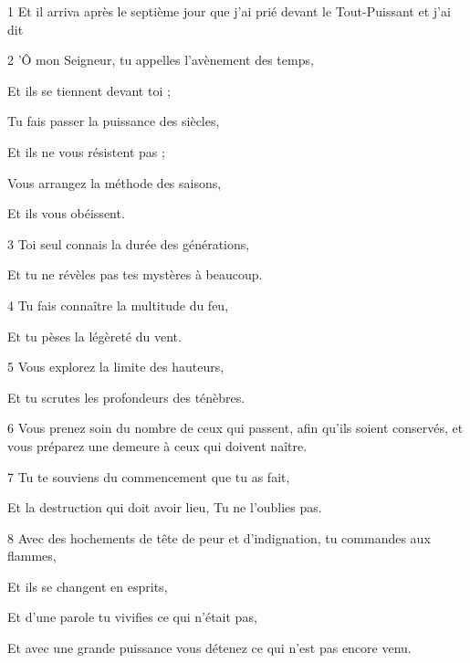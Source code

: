 \par 1 Et il arriva après le septième jour que j'ai prié devant le Tout-Puissant et j'ai dit

\par 2 'Ô mon Seigneur, tu appelles l'avènement des temps,

\par Et ils se tiennent devant toi ;

\par Tu fais passer la puissance des siècles,

\par Et ils ne vous résistent pas ;

\par Vous arrangez la méthode des saisons,

\par Et ils vous obéissent.

\par 3 Toi seul connais la durée des générations,

\par Et tu ne révèles pas tes mystères à beaucoup.

\par 4 Tu fais connaître la multitude du feu,

\par Et tu pèses la légèreté du vent.

\par 5 Vous explorez la limite des hauteurs,

\par Et tu scrutes les profondeurs des ténèbres.

\par 6 Vous prenez soin du nombre de ceux qui passent, afin qu'ils soient conservés, et vous préparez une demeure à ceux qui doivent naître.

\par 7 Tu te souviens du commencement que tu as fait,

\par Et la destruction qui doit avoir lieu, Tu ne l'oublies pas.

\par 8 Avec des hochements de tête de peur et d'indignation, tu commandes aux flammes,

\par Et ils se changent en esprits,

\par Et d'une parole tu vivifies ce qui n'était pas,

\par Et avec une grande puissance vous détenez ce qui n'est pas encore venu.

